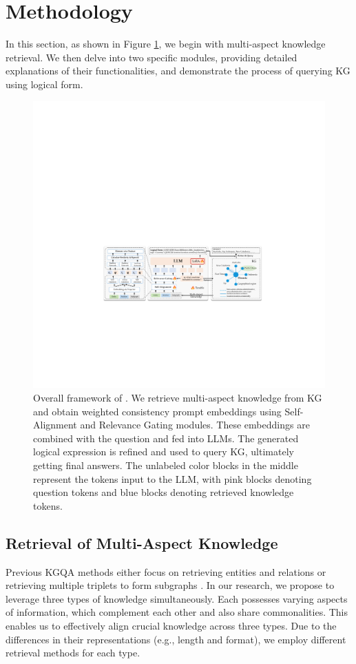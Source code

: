 \section{Methodology} \label{sec:method}
In this section, as shown in Figure \ref{fig:method}, we begin with multi-aspect knowledge retrieval. We then delve into two specific modules, providing detailed explanations of their functionalities, and demonstrate the process of querying KG using logical form.
\begin{figure}[t]
\centering
\includegraphics[width=0.9\linewidth]{img/method.pdf}
\caption{Overall framework of \model. We retrieve multi-aspect knowledge from KG and obtain weighted consistency prompt embeddings using Self-Alignment and Relevance Gating modules. These embeddings are combined with the question and fed into LLMs. The generated logical expression is refined and used to query KG, ultimately getting final answers. The unlabeled color blocks in the middle represent the tokens input to the LLM, with pink blocks denoting question tokens and blue blocks denoting retrieved knowledge tokens.
}
\label{fig:method}
\end{figure}

\subsection{Retrieval of Multi-Aspect Knowledge} \label{sec:Retrieve Multi-level Knowledge}
Previous KGQA methods either focus on retrieving entities and relations \cite{GMT-KBQA} or retrieving multiple triplets to form subgraphs \cite{decaf,G-retriever}. 
In our research, we propose to leverage three types of knowledge simultaneously. Each possesses varying aspects of information, which complement each other and also share commonalities. This enables us to effectively align crucial knowledge across three types.
Due to the differences in their representations (e.g., length and format), we employ different retrieval methods for each type.


